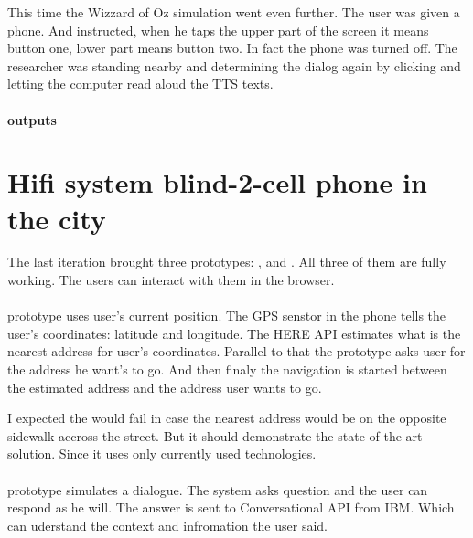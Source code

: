 	
	This time the Wizzard of Oz simulation went even further. The user was given a phone. And instructed, when he taps the upper part of the screen it means button one, lower part means button two. In fact the phone was turned off. The researcher was standing nearby and determining the dialog again by clicking and letting the computer read aloud the TTS texts.
	
	\paragraph{outputs}
	
	
	
	 
	\section{Hifi system blind-2-cell phone in the city}
	The last iteration brought three prototypes: \reversegeo, \gps and \poi. All three of them are fully working. The users can interact with them in the browser.
		
	
	\paragraph{\reversegeo}
	\reversegeo prototype uses user's current position. The GPS senstor in the phone tells the user's coordinates: latitude and longitude. The HERE API \cite{here-api} estimates what is the nearest address for user's coordinates. Parallel to that the prototype asks user for the address he want's to go. And then finaly the navigation is started between the estimated address and the address user wants to go.
	
	
	I expected the \reversegeo would fail in case the nearest address would be on the opposite sidewalk accross the street. But it should demonstrate the state-of-the-art solution. Since it uses only currently used technologies. 
	
	
	\paragraph{\poi}
	\poi prototype simulates a dialogue. The system asks question and the user can respond as he will. The answer is sent to Conversational API\cite{conversational-api} from IBM. Which can uderstand the context and infromation the user said.
	
